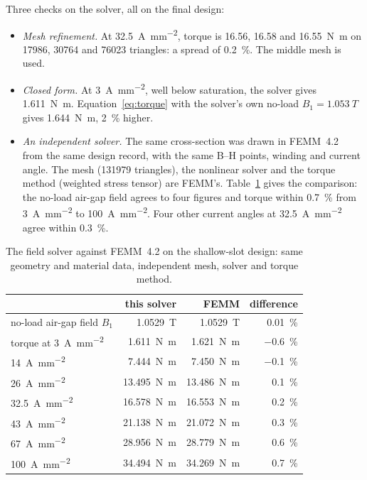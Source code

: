 \documentclass[11pt]{article}
\newcommand{\Amm}{\si{A\per\milli\metre\squared}}
\newcommand{\Nm}{\si{N.m}}
\begin{document}
Three checks on the solver, all on the final design:
\begin{itemize}
\item \emph{Mesh refinement.} At \SI{32.5}{\Amm}, torque is \num{16.56},
  \num{16.58} and \SI{16.55}{\Nm} on \num{17986}, \num{30764} and \num{76023}
  triangles: a spread of \SI{0.2}{\percent}. The middle mesh is used.
\item \emph{Closed form.} At \SI{3}{\Amm}, well below saturation, the solver
  gives \SI{1.611}{\Nm}. Equation~\eqref{eq:torque} with the solver's own
  no-load $B_1=\SI{1.053}{T}$ gives \SI{1.644}{\Nm}, \SI{2}{\percent} higher.
\item \emph{An independent solver.} The same cross-section was drawn in
  FEMM~4.2~\cite{meeker2018} from the same design record, with the same B--H
  points, winding and current angle. The mesh (\num{131979} triangles), the
  nonlinear solver and the torque method (weighted stress tensor) are FEMM's.
  Table~\ref{tab:femm} gives the comparison: the no-load air-gap field agrees
  to four figures and torque within \SI{0.7}{\percent} from \SI{3}{\Amm} to
  \SI{100}{\Amm}. Four other current angles at \SI{32.5}{\Amm} agree within
  \SI{0.3}{\percent}.
\end{itemize}

\begin{table}[h]
\centering
\begin{tabular}{lrrr}
\toprule
 & this solver & FEMM & difference\\
\midrule
no-load air-gap field $B_1$ & \SI{1.0529}{T} & \SI{1.0529}{T} & \SI{+0.01}{\percent}\\
torque at \SI{3}{\Amm} & \SI{1.611}{\Nm} & \SI{1.621}{\Nm} & \SI{-0.6}{\percent}\\
\SI{14}{\Amm} & \SI{7.444}{\Nm} & \SI{7.450}{\Nm} & \SI{-0.1}{\percent}\\
\SI{26}{\Amm} & \SI{13.495}{\Nm} & \SI{13.486}{\Nm} & \SI{+0.1}{\percent}\\
\SI{32.5}{\Amm} & \SI{16.578}{\Nm} & \SI{16.553}{\Nm} & \SI{+0.2}{\percent}\\
\SI{43}{\Amm} & \SI{21.138}{\Nm} & \SI{21.072}{\Nm} & \SI{+0.3}{\percent}\\
\SI{67}{\Amm} & \SI{28.956}{\Nm} & \SI{28.779}{\Nm} & \SI{+0.6}{\percent}\\
\SI{100}{\Amm} & \SI{34.494}{\Nm} & \SI{34.269}{\Nm} & \SI{+0.7}{\percent}\\
\bottomrule
\end{tabular}
\caption{The field solver against FEMM~4.2 on the shallow-slot design: same
geometry and material data, independent mesh, solver and torque method.}
\label{tab:femm}
\end{table}
\end{document}
